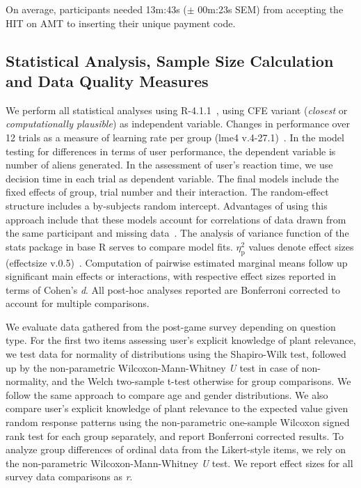 On average, participants needed 13m:43s ($\pm$ 00m:23s SEM) from accepting the HIT on AMT to inserting their unique payment code.

\subsection{Statistical Analysis, Sample Size Calculation and Data Quality Measures}

We perform all statistical analyses using R-4.1.1~\citep{r_core_team_r_2021}, using \gls{CFE} variant (\textit{closest} or \textit{computationally plausible}) as independent variable.
Changes in performance over 12 trials as a measure of learning rate per group (lme4 v.4-27.1)~\citep{bates_fitting_2015}.
In the model testing for differences in terms of user performance, the dependent variable is number of aliens generated. 
In the assessment of user's reaction time, we use decision time in each trial as dependent variable.
The final models include the fixed effects of group, trial number and their interaction. The random-effect structure includes a by-subjects random intercept. 
Advantages of using this approach include that these models account for correlations of data drawn from the same participant and missing data~\citep{detry_analyzing_2016,muth_alternative_2016}.
The analysis of variance function of the stats package in base R serves to compare model fits.
$\eta_{\text{p}}^{2}$ values denote effect sizes (effectsize v.0.5)~\citep{ben-shachar_effectsize_2020}.
Computation of pairwise estimated marginal means follow up significant main effects or interactions, with respective effect sizes reported in terms of Cohen's \textit{d}.
All post-hoc analyses reported are Bonferroni corrected to account for multiple comparisons.

We evaluate data gathered from the post-game survey depending on question type.
For the first two items assessing user's explicit knowledge of plant relevance, we test data for normality of distributions using the Shapiro-Wilk test, followed up by the non-parametric Wilcoxon-Mann-Whitney \textit{U} test in case of non-normality, and the Welch two-sample t-test otherwise for group comparisons. 
We follow the same approach to compare age and gender distributions.
We also compare user's explicit knowledge of plant relevance to the expected value given random response patterns using the non-parametric one-sample Wilcoxon signed rank test for each group separately, and report Bonferroni corrected results.
To analyze group differences of ordinal data from the Likert-style items, we rely on the non-parametric Wilcoxon-Mann-Whitney \textit{U} test.
We report effect sizes for all survey data comparisons as \textit{r}.

